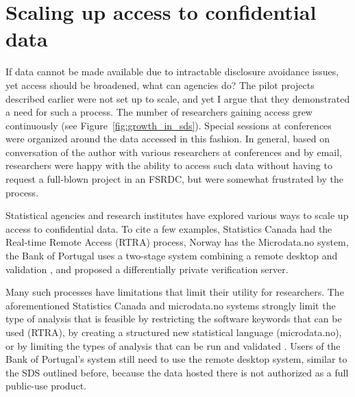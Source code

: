 \documentclass[]{hdsr}
\begin{document}
\section{Scaling up access to confidential data}

If data cannot be made available due to intractable disclosure avoidance issues, yet access should be broadened, what can agencies do? 
The pilot projects described earlier were not set up to scale, and yet I argue that  they demonstrated  a need for such a process. The number of researchers gaining access grew continuously (see Figure~\ref{fig:growth_in_sds}). Special sessions at conferences were organized around the data accessed in this fashion. In general, based on conversation of the author with various researchers at conferences and by email, researchers were happy with the ability to access such data without having to request a full-blown project in an FSRDC, but were somewhat frustrated by the process. 


Statistical agencies and research institutes have explored various ways to scale up access to confidential data. To cite a few examples, Statistics Canada had the Real-time Remote Access (RTRA) process, Norway has the Microdata.no system, the Bank of Portugal uses a two-stage system combining a remote desktop and validation \citep{guimaraes_reproducibility_2023}, and \citet{barrientos_providing_2018} proposed a differentially private verification server. 

Many such processes have limitations that limit their utility for researchers. The aforementioned Statistics Canada and microdata.no systems strongly limit the type of analysis that is feasible by restricting the software keywords that can be used (RTRA), by creating a structured new statistical language (microdata.no), or by limiting the types of analysis that can be run and validated \citep{barrientos_providing_2018}. Users of the Bank of Portugal's system still need to use the remote desktop system, similar to the SDS outlined before, because the data hosted there is not authorized as a full public-use product.
\end{document}
